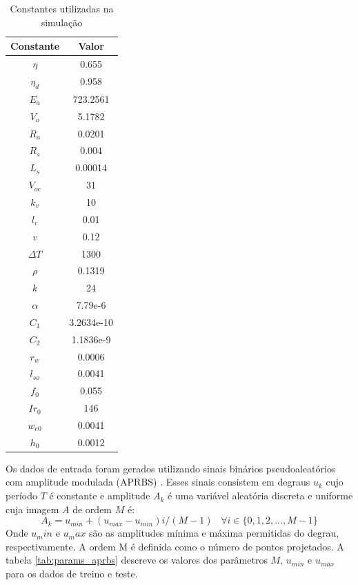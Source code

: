 \begin{table}[hbt!]
    \centering
    \begin{tabular}{|c|c|}
    \hline
    Constante & Valor \\
    \hline
    $\eta$ & 0.655 \\
    \hline
    $\eta_d$ & 0.958 \\
    \hline
    $E_a$ & 723.2561 \\
    \hline
    $V_o$ & 5.1782 \\
    \hline
    $R_a$ & 0.0201 \\
    \hline
    $R_s$ & 0.004 \\
    \hline
    $L_s$ & 0.00014 \\
    \hline
    $V_{oc}$ & 31 \\
    \hline
    $k_v$ & 10 \\
    \hline
    $l_c$ & 0.01 \\
    \hline
    $v$ & 0.12 \\
    \hline
    $\Delta T$ & 1300 \\
    \hline
    $\rho$ & 0.1319 \\
    \hline
    $k$ & 24 \\
    \hline
    $\alpha$ & 7.79e-6 \\
    \hline
    $C_1$ & 3.2634e-10 \\
    \hline
    $C_2$ & 1.1836e-9 \\
    \hline
    $r_w$ & 0.0006 \\
    \hline
    $l_{so}$ & 0.0041 \\
    \hline
    $f_0$ & 0.055 \\
    \hline
    $Ir_0$ & 146 \\
    \hline
    $w_{e0}$ & 0.0041 \\
    \hline
    $h_0$ & 0.0012 \\
    \hline
    \end{tabular}
    \caption{Constantes utilizadas na simulação}
    \label{tab:params_simulation}
\end{table}

Os dados de entrada foram gerados utilizando sinais binários pseudoaleatórios com amplitude modulada (APRBS) \cite{deflorian2011design, miriyala2020deep}. Esses sinais consistem em degraus $u_k$ cujo período $T$ é constante e amplitude $A_k$ é uma variável aleatória discreta e uniforme cuja imagem $A$ de ordem $M$ é:
\begin{equation}
    A_k = u_{min} + (u_{max} - u_{min})i/(M-1)\; \;\;
    \forall i \in \{0, 1, 2, \ldots, M-1\}
\end{equation}
Onde $u_min$ e $u_max$ são as amplitudes mínima e máxima permitidas do degrau, respectivamente. A ordem M é definida como o número de pontos projetados. A tabela \ref{tab:params_aprbs} descreve os valores dos parâmetros $M$, $u_{min}$ e $u_{max}$ para os dados de treino e teste.

